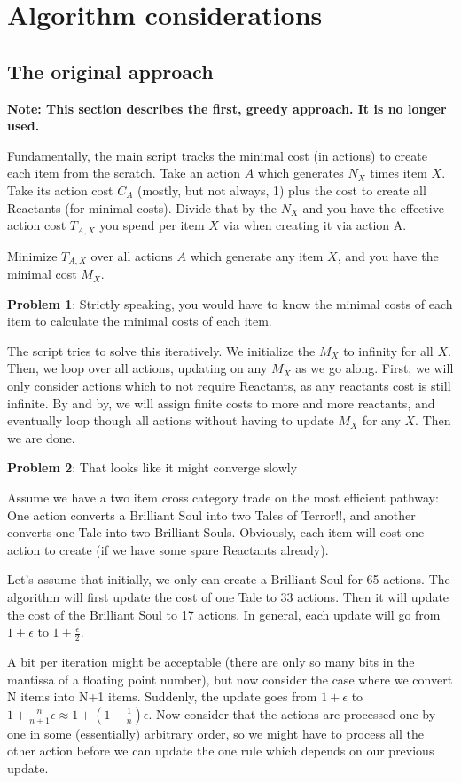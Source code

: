 \documentclass[a4paper,11pt,openright,twoside]{scrartcl}
\begin{document}
\section{Algorithm considerations}

\subsection{The original approach}
\textbf{Note: This section describes the first, greedy approach. It is no longer used.}

Fundamentally, the main script tracks the minimal cost (in actions) to create each item from the scratch. Take an action $A$ which generates $N_X$ times item $X$. Take its action cost $C_A$ (mostly, but not always, 1) plus the cost to create all Reactants (for minimal costs). Divide that by the $N_X$ and you have the effective action cost $T_{A, X}$ you spend per item $X$ via when creating it via action A.

Minimize $T_{A, X}$ over all actions $A$ which generate any item $X$, and you have the minimal cost $M_X$.

\textbf{Problem 1}: Strictly speaking, you would have to know the minimal costs of each item to calculate the minimal costs of each item. 

The script tries to solve this iteratively. We initialize the $M_X$ to infinity for all $X$. Then, we loop over all actions, updating on any $M_X$ as we go along. First, we will only consider actions which to not require Reactants, as any reactants cost is still infinite. By and by, we will assign finite costs to more and more reactants, and eventually loop though all actions without having to update $M_X$ for any $X$. Then we are done.

\textbf{Problem 2}: That looks like it might converge slowly

Assume we have a two item cross category trade on the most efficient pathway: 
One action converts a Brilliant Soul into two Tales of Terror!!, and another converts one Tale into two Brilliant Souls. Obviously, each item will cost one action to create (if we have some spare Reactants already).

Let's assume that initially, we only can create a Brilliant Soul for 65 actions. The algorithm will first update the cost of one Tale to 33 actions. Then it will update the cost of the Brilliant Soul to 17 actions. In general, each update will go from $1+\epsilon$ to $1+\frac{\epsilon}{2}$.

A bit per iteration might be acceptable (there are only so many bits in the mantissa of a floating point number), but now consider the case where we convert N items into N+1 items. Suddenly, the update goes from $1+\epsilon$ to $1+\frac{n}{n+1}\epsilon \approx 1+\left(1-\frac{1}{n}\right)\epsilon $. Now consider that the actions are processed one by one in some (essentially) arbitrary order, so we might have to process all the other action before we can update the one rule which depends on our previous update.
\end{document}
